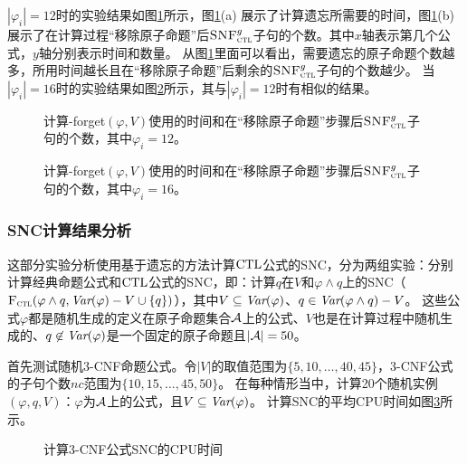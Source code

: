 $|\varphi_i|=12$时的实验结果如图\ref{chapter04:fig:for12}所示，图\ref{chapter04:fig:for12}(a) 展示了计算遗忘所需要的时间，图\ref{chapter04:fig:for12}(b)展示了在计算过程“移除原子命题”后${\textsc{SNF}_{\textsc{ctl}}^g}$子句的个数。其中$x$轴表示第几个公式，$y$轴分别表示时间和数量。
从图\ref{chapter04:fig:for12}里面可以看出，需要遗忘的原子命题个数越多，所用时间越长且在“移除原子命题”后剩余的${\textsc{SNF}_{\textsc{ctl}}^g}$子句的个数越少。
当$|\varphi_i|=16$时的实验结果如图\ref{chapter04:fig:for16}所示，其与$|\varphi_i|=12$时有相似的结果。

\begin{figure*}[!htb]
	\centering
	\caption{计算{\CTL-forget}$(\varphi, V)$使用的时间和在“移除原子命题”步骤后${\textsc{SNF}_{\textsc{ctl}}^g}$子句的个数，其中$\varphi_i=12$。}
	\label{chapter04:fig:for12}
\end{figure*}

\begin{figure*}[!htb]
	\centering
	\caption{计算{\CTL-forget}$(\varphi, V)$使用的时间和在“移除原子命题”步骤后${\textsc{SNF}_{\textsc{ctl}}^g}$子句的个数，其中$\varphi_i=16$。}
	\label{chapter04:fig:for16}
\end{figure*}

\subsubsection{SNC计算结果分析}
这部分实验分析使用基于遗忘的方法计算$\textrm{CTL}$公式的SNC，分为两组实验：分别计算经典命题公式和$\textrm{CTL}$公式的SNC，即：计算$q$在$V$和$\varphi \wedge q$上的SNC（${\textsc{F}_{\textsc{ctl}}}(\varphi\wedge q, \textit{Var}(\varphi)-V \cup \{q\})$），其中$V\subseteq \textit{Var}(\varphi)$、$q\in \textit{Var}(\varphi\wedge q)-V$。
这些公式$\varphi$都是随机生成的定义在原子命题集合${\cal A}$上的公式、$V$也是在计算过程中随机生成的、$q\not \in \textit{Var}(\varphi)$是一个固定的原子命题且$|{\cal A}|=50$。

首先测试随机3-CNF命题公式。令$|V|$的取值范围为$\{5,10,\dots, 40,45\}$，3-CNF公式的子句个数$nc$范围为$\{10,15,\dots, 45,50\}$。
在每种情形当中，计算20个随机实例$(\varphi,q,V)$：$\varphi$为${\cal A}$上的公式，且$V\subseteq \textit{Var}(\varphi)$。
计算SNC的平均CPU时间如图\ref{chapter04:fig:ProTime}所示。

\begin{figure*}[!htb]
	\centering
	\caption{%
		计算3-CNF公式SNC的CPU时间}
	\label{chapter04:fig:ProTime}
\end{figure*}


